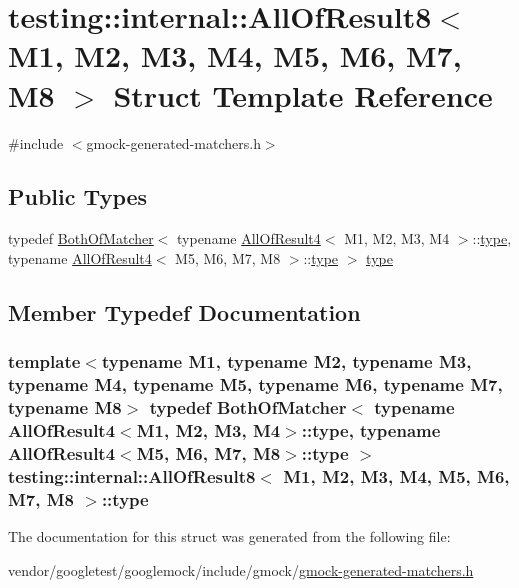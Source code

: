 \hypertarget{structtesting_1_1internal_1_1AllOfResult8}{}\section{testing\+:\+:internal\+:\+:All\+Of\+Result8$<$ M1, M2, M3, M4, M5, M6, M7, M8 $>$ Struct Template Reference}
\label{structtesting_1_1internal_1_1AllOfResult8}


{\ttfamily \#include $<$gmock-\/generated-\/matchers.\+h$>$}

\subsection*{Public Types}
\begin{DoxyCompactItemize}
\item 
typedef \hyperlink{classtesting_1_1internal_1_1BothOfMatcher}{Both\+Of\+Matcher}$<$ typename \hyperlink{structtesting_1_1internal_1_1AllOfResult4}{All\+Of\+Result4}$<$ M1, M2, M3, M4 $>$\+::\hyperlink{structtesting_1_1internal_1_1AllOfResult8_a7103892a28c35221b9e62e871c577727}{type}, typename \hyperlink{structtesting_1_1internal_1_1AllOfResult4}{All\+Of\+Result4}$<$ M5, M6, M7, M8 $>$\+::\hyperlink{structtesting_1_1internal_1_1AllOfResult8_a7103892a28c35221b9e62e871c577727}{type} $>$ \hyperlink{structtesting_1_1internal_1_1AllOfResult8_a7103892a28c35221b9e62e871c577727}{type}
\end{DoxyCompactItemize}


\subsection{Member Typedef Documentation}
\subsubsection[{\texorpdfstring{type}{type}}]{\setlength{\rightskip}{0pt plus 5cm}template$<$typename M1, typename M2, typename M3, typename M4, typename M5, typename M6, typename M7, typename M8$>$ typedef {\bf Both\+Of\+Matcher}$<$ typename {\bf All\+Of\+Result4}$<$M1, M2, M3, M4$>$\+::{\bf type}, typename {\bf All\+Of\+Result4}$<$M5, M6, M7, M8$>$\+::{\bf type} $>$ {\bf testing\+::internal\+::\+All\+Of\+Result8}$<$ M1, M2, M3, M4, M5, M6, M7, M8 $>$\+::{\bf type}}\hypertarget{structtesting_1_1internal_1_1AllOfResult8_a7103892a28c35221b9e62e871c577727}{}\label{structtesting_1_1internal_1_1AllOfResult8_a7103892a28c35221b9e62e871c577727}


The documentation for this struct was generated from the following file\+:\begin{DoxyCompactItemize}
\item 
vendor/googletest/googlemock/include/gmock/\hyperlink{gmock-generated-matchers_8h}{gmock-\/generated-\/matchers.\+h}\end{DoxyCompactItemize}
